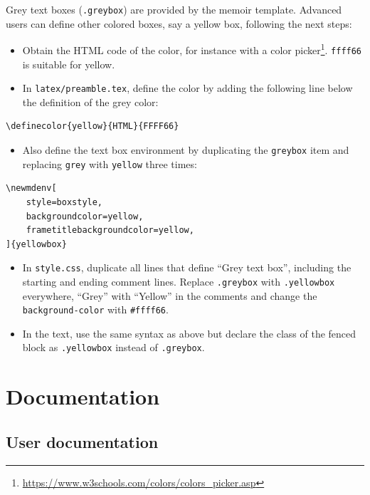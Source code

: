 \documentclass[
  12pt,
  american,
  a4paper,
  extrafontsizes,onecolumn,openright
  ]{memoir}
\providecommand{\tightlist}{%
  \setlength{\itemsep}{0pt}\setlength{\parskip}{0pt}}
\begin{document}
Grey text boxes (\texttt{.greybox}) are provided by the memoir template.
Advanced users can define other colored boxes, say a yellow box, following the next steps:

\begin{itemize}
\tightlist
\item
  Obtain the HTML code of the color, for instance with a color picker\footnote{\url{https://www.w3schools.com/colors/colors_picker.asp}}. \texttt{ffff66} is suitable for yellow.
\item
  In \texttt{latex/preamble.tex}, define the color by adding the following line below the definition of the grey color:
\end{itemize}

\begin{verbatim}
\definecolor{yellow}{HTML}{FFFF66}
\end{verbatim}

\begin{itemize}
\tightlist
\item
  Also define the text box environment by duplicating the \texttt{greybox} item and replacing \texttt{grey} with \texttt{yellow} three times:
\end{itemize}

\begin{verbatim}
\newmdenv[
    style=boxstyle,
    backgroundcolor=yellow,
    frametitlebackgroundcolor=yellow,
]{yellowbox}
\end{verbatim}

\begin{itemize}
\tightlist
\item
  In \texttt{style.css}, duplicate all lines that define \enquote{Grey text box}, including the starting and ending comment lines.
  Replace \texttt{.greybox} with \texttt{.yellowbox} everywhere, \enquote{Grey} with \enquote{Yellow} in the comments and change the \texttt{background-color} with \texttt{\#ffff66}.
\item
  In the text, use the same syntax as above but declare the class of the fenced block as \texttt{.yellowbox} instead of \texttt{.greybox}.
\end{itemize}

\section{Documentation}\label{documentation}

\subsection{User documentation}\label{user-documentation}
\end{document}
